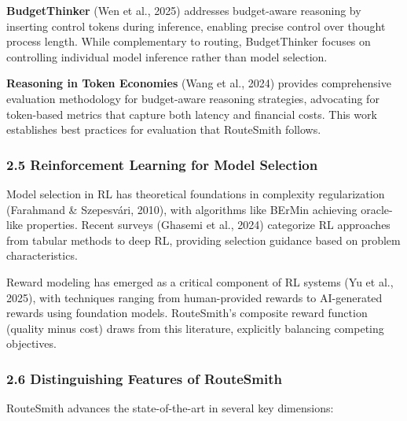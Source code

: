 \documentclass[
]{article}
\begin{document}
\textbf{BudgetThinker} (Wen et al., 2025) addresses budget-aware
reasoning by inserting control tokens during inference, enabling precise
control over thought process length. While complementary to routing,
BudgetThinker focuses on controlling individual model inference rather
than model selection.

\textbf{Reasoning in Token Economies} (Wang et al., 2024) provides
comprehensive evaluation methodology for budget-aware reasoning
strategies, advocating for token-based metrics that capture both latency
and financial costs. This work establishes best practices for evaluation
that RouteSmith follows.

\hypertarget{reinforcement-learning-for-model-selection}{%
\subsubsection{2.5 Reinforcement Learning for Model
Selection}\label{reinforcement-learning-for-model-selection}}

Model selection in RL has theoretical foundations in complexity
regularization (Farahmand \& Szepesvári, 2010), with algorithms like
BErMin achieving oracle-like properties. Recent surveys (Ghasemi et al.,
2024) categorize RL approaches from tabular methods to deep RL,
providing selection guidance based on problem characteristics.

Reward modeling has emerged as a critical component of RL systems (Yu et
al., 2025), with techniques ranging from human-provided rewards to
AI-generated rewards using foundation models. RouteSmith's composite
reward function (quality minus cost) draws from this literature,
explicitly balancing competing objectives.

\hypertarget{distinguishing-features-of-routesmith}{%
\subsubsection{2.6 Distinguishing Features of
RouteSmith}\label{distinguishing-features-of-routesmith}}

RouteSmith advances the state-of-the-art in several key dimensions:
\end{document}
